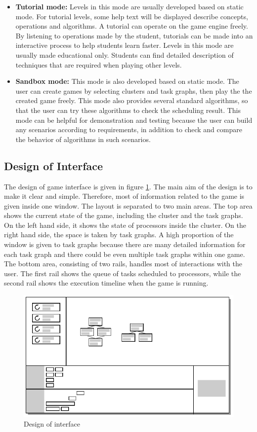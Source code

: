 \documentclass[msc,deptreport, cs]{infthesis}
\begin{document}
\begin{itemize}
  \item \textbf{Tutorial mode:} Levels in this mode are usually developed based on static mode. For tutorial levels, some help text will be displayed describe concepts, operations and algorithms. A tutorial can operate on the game engine freely. By listening to operations made by the student, tutorials can be made into an interactive process to help students learn faster. Levels in this mode are usually made educational only. Students can find detailed description of techniques that are required when playing other levels.

  \item \textbf{Sandbox mode:} This mode is also developed based on static mode. The user can create games by selecting clusters and task graphs, then play the the created game freely. This mode also provides several standard algorithms, so that the user can try these algorithms to check the scheduling result. This mode can be helpful for demonstration and testing because the user can build any scenarios according to requirements, in addition to check and compare the behavior of algorithms in such scenarios.
\end{itemize}

\subsection{Design of Interface}

The design of game interface is given in figure \ref{fig:layout}. The main aim of the design is to make it clear and simple. Therefore, most of information related to the game is given inside one window. The layout is separated to two main areas. The top area shows the current state of the game, including the cluster and the task graphs. On the left hand side, it shows the state of processors inside the cluster. On the right hand side, the space is taken by task graphs. A high proportion of the window is given to task graphs because there are many detailed information for each task graph and there could be even multiple task graphs within one game. The bottom area, consisting of two rails, handles most of interactions with the user. The first rail shows the queue of tasks scheduled to processors, while the second rail shows the execution timeline when the game is running.

\begin{figure}[!htb]
  \centering
  \includegraphics[width=0.8\columnwidth]{layout.pdf}
  \caption{Design of interface}
  \label{fig:layout}
\end{figure}
\end{document}
